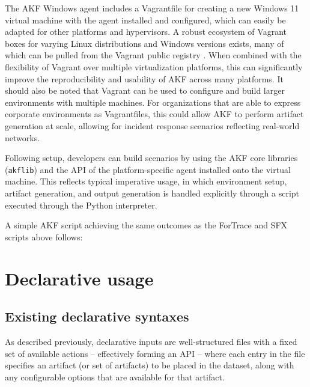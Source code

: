 The AKF Windows agent includes a Vagrantfile for creating a new Windows
11 virtual machine with the agent installed and configured, which can
easily be adapted for other platforms and hypervisors. A robust
ecosystem of Vagrant boxes for varying Linux distributions and Windows
versions exists, many of which can be pulled from the Vagrant public
registry \cite{hashicorpHashiCorpCloudPlatform}. When combined with
the flexibility of Vagrant over multiple virtualization platforms, this
can significantly improve the reproducibility and usability of AKF
across many platforms. It should also be noted that Vagrant can be used
to configure and build larger environments with multiple machines. For
organizations that are able to express corporate environments as
Vagrantfiles, this could allow AKF to perform artifact generation at
scale, allowing for incident response scenarios reflecting real-world
networks.

Following setup, developers can build scenarios by using the AKF core
libraries (\passthrough{\lstinline!akflib!}) and the API of the
platform-specific agent installed onto the virtual machine. This
reflects typical imperative usage, in which environment setup, artifact
generation, and output generation is handled explicitly through a script
executed through the Python interpreter.

A simple AKF script achieving the same outcomes as the ForTrace and SFX
scripts above follows:

\section{Declarative usage}\label{declarative-usage}

\subsection{Existing declarative
syntaxes}\label{existing-declarative-syntaxes}

As described previously, declarative inputs are well-structured files
with a fixed set of available actions -- effectively forming an API --
where each entry in the file specifies an artifact (or set of artifacts)
to be placed in the dataset, along with any configurable options that
are available for that artifact.


